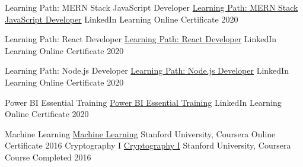 \begin{cvhonors}
  
  \cvhonor
    {
    {Learning Path: MERN Stack JavaScript Developer}
    {\href{https://www.linkedin.com/learning/paths/become-a-mern-stack-javascript-developer}
    {Learning Path: MERN Stack JavaScript Developer}}}
    {LinkedIn Learning}
    {
    {Online Certificate}
    {\href{https://mukeshmk.github.io/assets/certificates/LinkedIn\%20Learning\%20-\%20Become\%20a\%20MERN\%20Stack\%20JavaScript\%20Developer.pdf}{}}}
    {2020}
  
  \cvhonor
    {
    {Learning Path: React Developer}
    {\href{https://www.linkedin.com/learning/paths/become-a-react-developer}
    {Learning Path: React Developer}}}
    {LinkedIn Learning}
    {
    {Online Certificate}
    {\href{https://mukeshmk.github.io/assets/certificates/LinkedIn\%20Learning\%20-\%20Become\%20a\%20React\%20Developer.pdf}{}}}
    {2020}

  \cvhonor
    {
    {Learning Path: Node.js Developer}
    {\href{https://www.linkedin.com/learning/paths/become-a-node-js-developer}
    {Learning Path: Node.js Developer}}}
    {LinkedIn Learning}
    {
    {Online Certificate}
    {\href{https://mukeshmk.github.io/assets/certificates/LinkedIn\%20Learning\%20-\%20Learning\%20Path\%20-\%20Become\%20a\%20Node.js\%20Developer.pdf}{}}}
    {2020}

  \cvhonor
    {
    {Power BI Essential Training}
    {\href{https://www.coursera.org/learn/machine-learning}
    {Power BI Essential Training}}}
    {LinkedIn Learning}
    {
    {Online Certificate}
    {\href{https://mukeshmk.github.io/assets/certificates/LinkedIn\%20Learning\%20-\%20Power\%20BI\%20Essential\%20Training\%20-\%20Certificate.pdf}{}}}
    {2020}
    
  \cvhonor
    {
    {Machine Learning}
    {\href{https://www.coursera.org/learn/machine-learning}{Machine Learning}}}
    {Stanford University, Coursera}
    {
    {Online Certificate}
    {\href{https://www.coursera.org/account/accomplishments/verify/ZWCUVR3HSXTM}{}}}
    {2016}
  \cvhonor
    {
    {Cryptography I}
    {\href{https://www.coursera.org/learn/crypto}{Cryptography I}}}
    {Stanford University, Coursera}
    {Course Completed}
    {2016}
\end{cvhonors}

